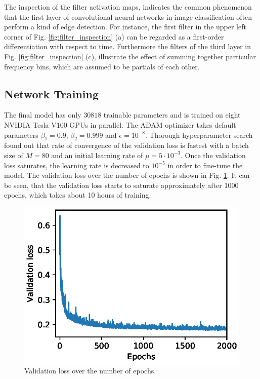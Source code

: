 \documentclass{scrartcl}
\begin{document}
The inspection of the filter activation maps, indicates the common phenomenon that the first layer of convolutional neural networks in image classification often perform a kind of edge detection. For instance, the first filter in the upper left corner of Fig. \ref{fig:filter_inspection} (a) can be regarded as a first-order differentiation with respect to time. Furthermore the filters of the third layer in Fig. \ref{fig:filter_inspection} (c), illustrate the effect of summing together particular frequency bins, which are assumed to be partials of each other.





\subsection{Network Training}

The final model has only $\num[group-separator={,}]{30818}$ trainable parameters and is trained on eight NVIDIA Tesla V100 GPUs in parallel. The ADAM optimizer \cite{Kingma2014} takes default parameters $\beta_1=0.9$, $\beta_2=0.999$ and $\epsilon=10^{-8}$. Thorough hyperparameter search found out that rate of convergence of the validation loss is fastest with a batch size of $M = 80$ and an initial learning rate of $\mu = 5 \cdot10^{-3}$. Once the validation loss saturates, the learning rate is decreased to $10^{-5}$ in order to fine-tune the model. The validation loss over the number of epochs is shown in Fig. \ref{fig:validation_loss}. It can be seen, that the validation loss starts to saturate approximately after 1000 epochs, which takes about 10 hours of training. 
\begin{figure}[htbp]
\centering
\includegraphics[scale=0.82]{figures/validation_loss.eps}
\caption{Validation loss over the number of epochs. }
\label{fig:validation_loss}
\end{figure}
\end{document}

